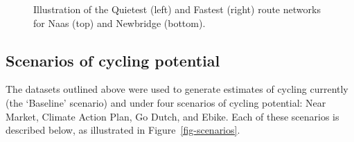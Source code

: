 \documentclass[
  super,
  preprint,
  3p]{elsarticle}
\begin{document}
\begin{figure}
\begin{minipage}[t]{0.50\linewidth}
{{}

}

\end{minipage}%
%
\begin{minipage}[t]{0.50\linewidth}

{\centering 


}

\end{minipage}%

\caption{\label{fig-route-types}Illustration of the Quietest (left) and
Fastest (right) route networks for Naas (top) and Newbridge (bottom).}

\end{figure}

\hypertarget{sec-scenarios}{%
\subsection{Scenarios of cycling potential}\label{sec-scenarios}}

The datasets outlined above were used to generate estimates of cycling
currently (the `Baseline' scenario) and under four scenarios of cycling
potential: Near Market, Climate Action Plan, Go Dutch, and Ebike. Each
of these scenarios is described below, as illustrated in
Figure~\ref{fig-scenarios}.
\end{document}
